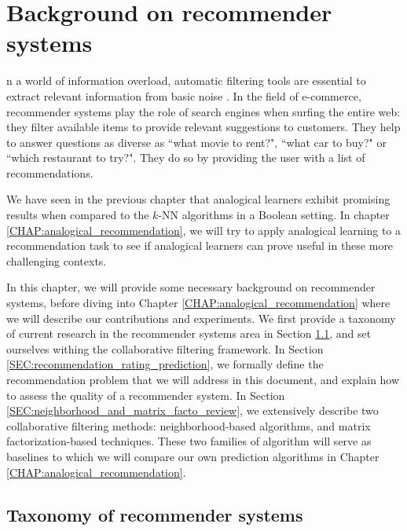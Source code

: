 \chapter{Background on recommender systems}
\label{CHAP:background_reco_systems}
\localtableofcontents*
\vspace*{\baselineskip}

n a world of information overload, automatic filtering tools are
essential to extract relevant information from basic noise
\cite{RecoSystemHandbook,AdoTuzIEEE2005}. In the field of e-commerce,
recommender systems play the role of search engines when surfing the entire
web: they filter available items to provide relevant suggestions to customers.
They help to answer questions as diverse as ``what movie to rent?", ``what car
to buy?" or ``which restaurant to try?". They do so by providing the user with
a list of recommendations.

We have seen in the previous chapter that analogical learners exhibit promising
results when compared to the $k$-NN algorithms in a Boolean setting. In chapter
\ref{CHAP:analogical_recommendation}, we will try to apply analogical learning
to a recommendation task to see if analogical learners can prove useful in
these more challenging contexts.

In this chapter, we will provide some necessary background on recommender
systems, before diving into Chapter \ref{CHAP:analogical_recommendation} where
we will describe our contributions and experiments. We first provide a taxonomy
of current research in the recommender systems area in Section
\ref{SEC:taxonomy_rec_sys}, and set ourselves withing the collaborative
filtering framework. In Section \ref{SEC:recommendation_rating_prediction}, we
formally define the recommendation problem that we will address in this
document, and explain how to assess the quality of a recommender system. In
Section \ref{SEC:neighborhood_and_matrix_facto_review}, we extensively describe
two collaborative filtering methods: neighborhood-based algorithms, and matrix
factorization-based techniques. These two families of algorithm will serve as
baselines to which we will compare our own prediction algorithms in Chapter
\ref{CHAP:analogical_recommendation}.

\section{Taxonomy of recommender systems}
\label{SEC:taxonomy_rec_sys}


